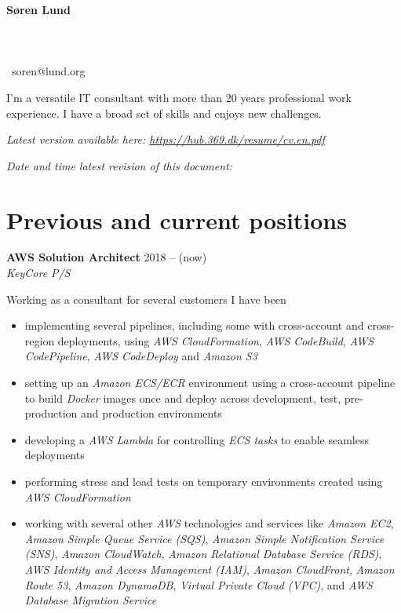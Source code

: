 \documentclass[a4paper,11pt]{article}
\newcommand\redacted{[hidden in online version]}
\newcommand\myaddressone{\redacted}
\newcommand\myaddresstwo{\redacted}
\newcommand\myphone{\redacted}
\begin{document}
\centerline{}
\bigskip

\begin{minipage}[b]{0.30\textwidth}
  \selectfont%
  \textbf{Søren Lund} \\
  \myaddressone \\
  \myaddresstwo \\
  \myphone \\
  \Email\ soren@lund.org
\end{minipage}%
\hfill
\begin{minipage}[b]{0.30\textwidth}
  \selectfont%
  I'm a versatile IT consultant with
  more than 20 years professional 
  work experience. I have a broad
  set of skills and enjoys new
  challenges.
\end{minipage}

\bigskip
\centerline{\small\textit{Latest version available here: \url{https://hub.369.dk/resume/cv.en.pdf}}}
\centerline{\small\textit{Date and time latest revision of this document: }}

\section*{Previous and current positions}

\textbf{AWS Solution Architect} \hfill 2018 -- (now) \\
\textsl{KeyCore P/S}

Working as a consultant for several customers I have been 

\begin{itemize}
  \item implementing several pipelines, including some with
    cross-account and cross-region deployments, using \textit{AWS
      CloudFormation}, \textit{AWS CodeBuild}, \textit{AWS
      CodePipeline}, \textit{AWS CodeDeploy} and \textit{Amazon S3}
  \item setting up an \textit{Amazon ECS/ECR} environment using a
    cross-account pipeline to build \textit{Docker} images once and
    deploy across development, test, pre-production and production
    environments
  \item developing a \textit{AWS Lambda} for controlling \textit{ECS
    tasks} to enable seamless deployments
  \item performing stress and load tests on temporary environments
    created using \textit{AWS CloudFormation}
  \item working with several other \textit{AWS} technologies and
    services like \textit{Amazon EC2}, \textit{Amazon Simple Queue
      Service (SQS)}, \textit{Amazon Simple Notification Service
      (SNS)}, \textit{Amazon CloudWatch}, \textit{Amazon Relational
      Database Service (RDS)}, \textit{AWS Identity and Access
      Management (IAM)}, \textit{Amazon CloudFront}, \textit{Amazon
      Route 53}, \textit{Amazon DynamoDB}, \textit{Virtual Private
      Cloud (VPC)}, and \textit{AWS Database Migration Service}
\end{itemize}
\end{document}

